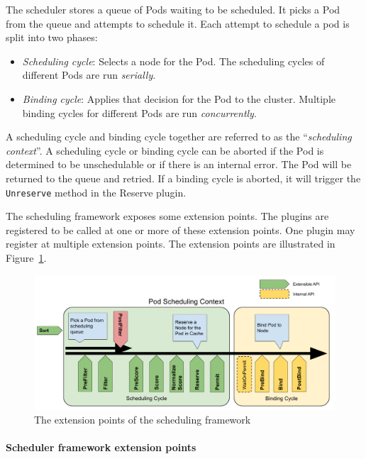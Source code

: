 The scheduler stores a queue of Pods waiting to be scheduled. It picks a Pod
from the queue and attempts to schedule it. Each attempt to schedule a pod is
split into two phases:

\begin{itemize}
      \tightlist
      \item \textit{Scheduling cycle}: Selects a node for the Pod. The
            scheduling cycles of different Pods are run \textit{serially}.
      \item \textit{Binding cycle}: Applies that decision for the Pod to the
            cluster. Multiple binding cycles for different Pods are run
            \textit{concurrently}.
\end{itemize}

A scheduling cycle and binding cycle together are referred to as the
``\textit{scheduling context}''. A scheduling cycle or binding cycle can be
aborted if the Pod is determined to be unschedulable or if there is an internal
error. The Pod will be returned to the queue and retried. If a binding cycle is
aborted, it will trigger the \texttt{Unreserve} method in the Reserve plugin.


The scheduling framework exposes some extension points. The plugins are
registered to be called at one or more of these extension points. One plugin may
register at multiple extension points. The extension points are illustrated in
Figure~\ref{fig:scheduling-plugins}.

\begin{figure}[ht]
      \centering
      \includegraphics[width=\textwidth]{chapters/background/img/scheduler.png}
      \caption{The extension points of the scheduling framework}
      \label{fig:scheduling-plugins}
\end{figure}


\paragraph*{Scheduler framework extension points}

